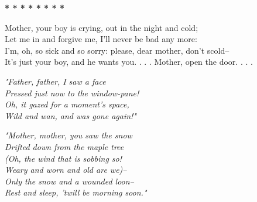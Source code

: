 \begin{poemblock}
\centerline{\textbf{*   *   *   *   *   *   *   *}}

Mother, your boy is crying, out in the night and cold;\\
\idt Let me in and forgive me, I'll never be bad any more:\\
I'm, oh, so sick and so sorry:  please, dear mother, don't scold--\\
\idt It's just your boy, and he wants you. . . .  Mother, open the door. . . .

\textit{
"Father, father, I saw a face\\
\idt Pressed just now to the window-pane!\\
Oh, it gazed for a moment's space,\\
\idt Wild and wan, and was gone again!"
}

\textit{
"Mother, mother, you saw the snow\\
\idt Drifted down from the maple tree\\
(Oh, the wind that is sobbing so!\\
\idt Weary and worn and old are we)--\\
Only the snow and a wounded loon--\\
Rest and sleep, 'twill be morning soon."
}
\end{poemblock}
